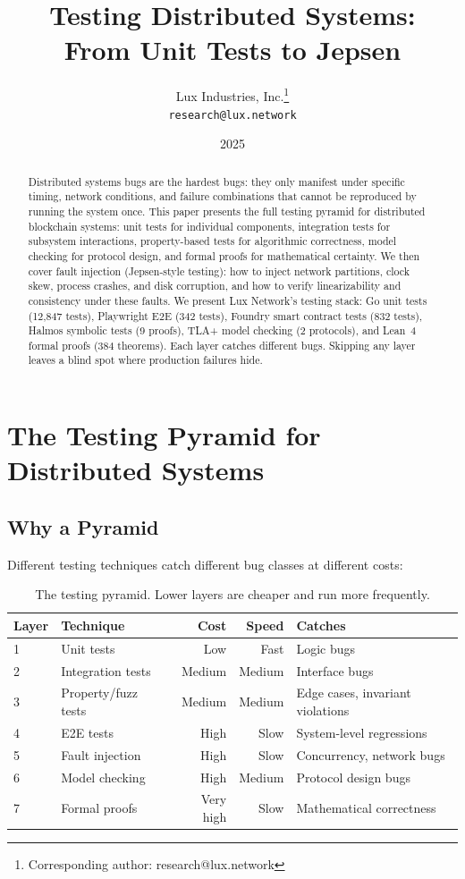 \documentclass[11pt,a4paper]{article}
\title{Testing Distributed Systems:\\From Unit Tests to Jepsen}
\author{
Lux Industries, Inc.\thanks{Corresponding author: research@lux.network}\\
\texttt{research@lux.network}
}
\date{2025}
\begin{document}
\luxcoverpage

\begin{abstract}
Distributed systems bugs are the hardest bugs: they only manifest under specific timing,
network conditions, and failure combinations that cannot be reproduced by running the
system once. This paper presents the full testing pyramid for distributed blockchain
systems: unit tests for individual components, integration tests for subsystem
interactions, property-based tests for algorithmic correctness, model checking for
protocol design, and formal proofs for mathematical certainty. We then cover fault
injection (Jepsen-style testing): how to inject network partitions, clock skew, process
crashes, and disk corruption, and how to verify linearizability and consistency under
these faults. We present Lux Network's testing stack: Go unit tests (12,847 tests),
Playwright E2E (342 tests), Foundry smart contract tests (832 tests), Halmos symbolic
tests (9 proofs), TLA+ model checking (2 protocols), and Lean~4 formal proofs (384
theorems). Each layer catches different bugs. Skipping any layer leaves a blind spot
where production failures hide.
\end{abstract}

\tableofcontents
\newpage

\section{The Testing Pyramid for Distributed Systems}

\subsection{Why a Pyramid}

Different testing techniques catch different bug classes at different costs:

\begin{table}[H]
\centering
\small
\begin{tabular}{@{}llrrl@{}}
\toprule
\textbf{Layer} & \textbf{Technique} & \textbf{Cost} & \textbf{Speed} & \textbf{Catches} \\
\midrule
1 & Unit tests & Low & Fast & Logic bugs \\
2 & Integration tests & Medium & Medium & Interface bugs \\
3 & Property/fuzz tests & Medium & Medium & Edge cases, invariant violations \\
4 & E2E tests & High & Slow & System-level regressions \\
5 & Fault injection & High & Slow & Concurrency, network bugs \\
6 & Model checking & High & Medium & Protocol design bugs \\
7 & Formal proofs & Very high & Slow & Mathematical correctness \\
\bottomrule
\end{tabular}
\caption{The testing pyramid. Lower layers are cheaper and run more frequently.}
\end{table}
\end{document}
